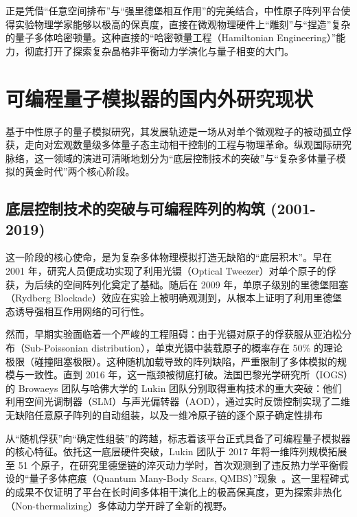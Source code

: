 \documentclass[../main.tex]{subfiles}
\begin{document}
正是凭借“任意空间排布”与“强里德堡相互作用”的完美结合，中性原子阵列平台使得实验物理学家能够以极高的保真度，直接在微观物理硬件上“雕刻”与“捏造”复杂的量子多体哈密顿量。这种直接的“哈密顿量工程（Hamiltonian Engineering）”能力，彻底打开了探索复杂晶格非平衡动力学演化与量子相变的大门。

\section{可编程量子模拟器的国内外研究现状}
\label{ch1:sec:status}

基于中性原子的量子模拟研究，其发展轨迹是一场从对单个微观粒子的被动孤立俘获，走向对宏观数量级多体量子态主动相干控制的工程与物理革命。纵观国际研究脉络，这一领域的演进可清晰地划分为“底层控制技术的突破”与“复杂多体量子模拟的黄金时代”两个核心阶段。

\subsection{底层控制技术的突破与可编程阵列的构筑 (2001-2019)}
\label{ch1:subsec:status_early}

这一阶段的核心使命，是为复杂多体物理模拟打造无缺陷的“底层积木”。早在 2001 年，研究人员便成功实现了利用光镊（Optical Tweezer）对单个原子的俘获\cite{schlosser2001sub}，为后续的空间阵列化奠定了基础。随后在 2009 年，单原子级别的里德堡阻塞（Rydberg Blockade）效应在实验上被明确观测到\cite{urban2009observation, gaetan2009observation}，从根本上证明了利用里德堡态诱导强相互作用网络的可行性。

然而，早期实验面临着一个严峻的工程阻碍：由于光镊对原子的俘获服从亚泊松分布（Sub-Poissonian distribution），单束光镊中装载原子的概率存在 50\% 的理论极限（碰撞阻塞极限）。这种随机加载导致的阵列缺陷，严重限制了多体模拟的规模与一致性。直到 2016 年，这一瓶颈被彻底打破。法国巴黎光学研究所（IOGS）的 Browaeys 团队与哈佛大学的 Lukin 团队分别取得重构技术的重大突破：他们利用空间光调制器（SLM）与声光偏转器（AOD），通过实时反馈控制实现了二维无缺陷任意原子阵列的自动组装，以及一维冷原子链的逐个原子确定性排布~\cite{barredo2016atom, endres2016atom}

从“随机俘获”向“确定性组装”的跨越，标志着该平台正式具备了可编程量子模拟器的核心特征。依托这一底层硬件突破，Lukin 团队于 2017 年将一维阵列规模拓展至 51 个原子，在研究里德堡链的淬灭动力学时，首次观测到了违反热力学平衡假设的“量子多体疤痕（Quantum Many-Body Scars, QMBS）”现象~\cite{bernien2017probing}。这一里程碑式的成果不仅证明了平台在长时间多体相干演化上的极高保真度，更为探索非热化（Non-thermalizing）多体动力学开辟了全新的视野。
\end{document}
